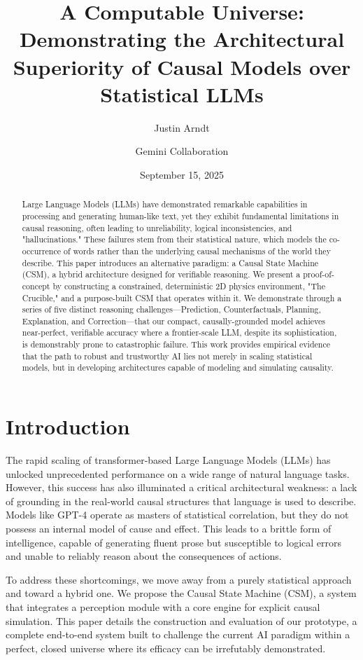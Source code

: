 \documentclass[11pt, letterpaper]{article}
\title{\textbf{A Computable Universe: Demonstrating the Architectural Superiority of Causal Models over Statistical LLMs}}
\author[1]{Justin Arndt}
\author[2]{Gemini Collaboration}
\affil[1]{Independent Researcher, The Alexandria Project}
\affil[2]{AI System Architecture \& Strategy}
\date{September 15, 2025}
\begin{document}
\maketitle

\begin{abstract}
\noindent
Large Language Models (LLMs) have demonstrated remarkable capabilities in processing and generating human-like text, yet they exhibit fundamental limitations in causal reasoning, often leading to unreliability, logical inconsistencies, and "hallucinations." These failures stem from their statistical nature, which models the co-occurrence of words rather than the underlying causal mechanisms of the world they describe. This paper introduces an alternative paradigm: a Causal State Machine (CSM), a hybrid architecture designed for verifiable reasoning. We present a proof-of-concept by constructing a constrained, deterministic 2D physics environment, "The Crucible," and a purpose-built CSM that operates within it. We demonstrate through a series of five distinct reasoning challenges—Prediction, Counterfactuals, Planning, Explanation, and Correction—that our compact, causally-grounded model achieves near-perfect, verifiable accuracy where a frontier-scale LLM, despite its sophistication, is demonstrably prone to catastrophic failure. This work provides empirical evidence that the path to robust and trustworthy AI lies not merely in scaling statistical models, but in developing architectures capable of modeling and simulating causality.
\end{abstract}

\section{Introduction}
The rapid scaling of transformer-based Large Language Models (LLMs) has unlocked unprecedented performance on a wide range of natural language tasks. However, this success has also illuminated a critical architectural weakness: a lack of grounding in the real-world causal structures that language is used to describe. Models like GPT-4 operate as masters of statistical correlation, but they do not possess an internal model of cause and effect. This leads to a brittle form of intelligence, capable of generating fluent prose but susceptible to logical errors and unable to reliably reason about the consequences of actions.

To address these shortcomings, we move away from a purely statistical approach and toward a hybrid one. We propose the Causal State Machine (CSM), a system that integrates a perception module with a core engine for explicit causal simulation. This paper details the construction and evaluation of our prototype, a complete end-to-end system built to challenge the current AI paradigm within a perfect, closed universe where its efficacy can be irrefutably demonstrated.
\end{document}
